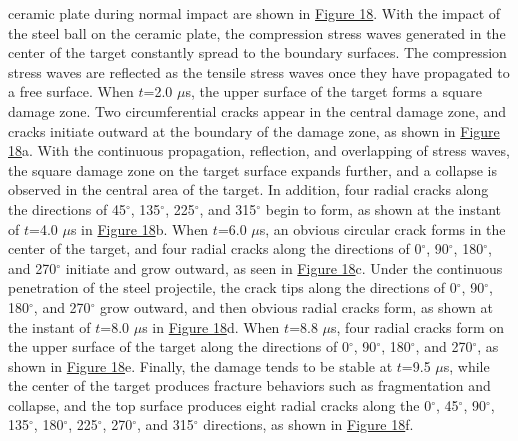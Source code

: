 \documentclass[11pt]{article}
\begin{document}
ceramic plate during normal impact are shown in \href{https://pmc.ncbi.nlm.nih.gov/articles/PMC10254440/?utm_source=chatgpt.com\#materials-16-04050-f018}{Figure 18}. With the impact of the steel ball on the ceramic plate, the compression stress waves generated in the center of the target constantly spread to the boundary surfaces. The compression stress waves are reflected as the tensile stress waves once they have propagated to a free surface. When \(t\)=2.0 \(\mu\)s, the upper surface of the target forms a square damage zone. Two circumferential cracks appear in the central damage zone, and cracks initiate outward at the boundary of the damage zone, as shown in \href{https://pmc.ncbi.nlm.nih.gov/articles/PMC10254440/?utm_source=chatgpt.com\#materials-16-04050-f018}{Figure 18}a. With the continuous propagation, reflection, and overlapping of stress waves, the square damage zone on the target surface expands further, and a collapse is observed in the central area of the target. In addition, four radial cracks along the directions of 45\(^{\circ}\), 135\(^{\circ}\), 225\(^{\circ}\), and 315\(^{\circ}\) begin to form, as shown at the instant of \(t\)=4.0 \(\mu\)s in \href{https://pmc.ncbi.nlm.nih.gov/articles/PMC10254440/?utm_source=chatgpt.com\#materials-16-04050-f018}{Figure 18}b. When \(t\)=6.0 \(\mu\)s, an obvious circular crack forms in the center of the target, and four radial cracks along the directions of 0\(^{\circ}\), 90\(^{\circ}\), 180\(^{\circ}\), and 270\(^{\circ}\) initiate and grow outward, as seen in \href{https://pmc.ncbi.nlm.nih.gov/articles/PMC10254440/?utm_source=chatgpt.com\#materials-16-04050-f018}{Figure 18}c. Under the continuous penetration of the steel projectile, the crack tips along the directions of 0\(^{\circ}\), 90\(^{\circ}\), 180\(^{\circ}\), and 270\(^{\circ}\) grow outward, and then obvious radial cracks form, as shown at the instant of \(t\)=8.0 \(\mu\)s in \href{https://pmc.ncbi.nlm.nih.gov/articles/PMC10254440/?utm_source=chatgpt.com\#materials-16-04050-f018}{Figure 18}d. When \(t\)=8.8 \(\mu\)s, four radial cracks form on the upper surface of the target along the directions of 0\(^{\circ}\), 90\(^{\circ}\), 180\(^{\circ}\), and 270\(^{\circ}\), as shown in \href{https://pmc.ncbi.nlm.nih.gov/articles/PMC10254440/?utm_source=chatgpt.com\#materials-16-04050-f018}{Figure 18}e. Finally, the damage tends to be stable at \(t\)=9.5 \(\mu\)s, while the center of the target produces fracture behaviors such as fragmentation and collapse, and the top surface produces eight radial cracks along the 0\(^{\circ}\), 45\(^{\circ}\), 90\(^{\circ}\), 135\(^{\circ}\), 180\(^{\circ}\), 225\(^{\circ}\), 270\(^{\circ}\), and 315\(^{\circ}\) directions, as shown in \href{https://pmc.ncbi.nlm.nih.gov/articles/PMC10254440/?utm_source=chatgpt.com\#materials-16-04050-f018}{Figure 18}f.
\end{document}
